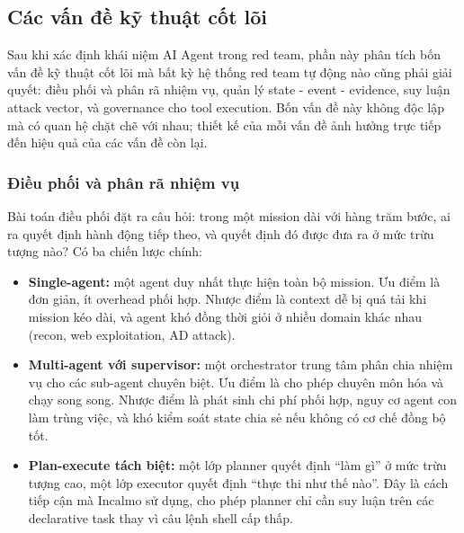 
\subsection{Các vấn đề kỹ thuật cốt lõi}
\label{sec:van-de-ky-thuat}

Sau khi xác định khái niệm AI Agent trong red team, phần này phân tích bốn vấn đề kỹ thuật cốt lõi mà bất kỳ hệ thống red team tự động nào cũng phải giải quyết: điều phối và phân rã nhiệm vụ, quản lý state - event - evidence, suy luận attack vector, và governance cho tool execution. Bốn vấn đề này không độc lập mà có quan hệ chặt chẽ với nhau; thiết kế của mỗi vấn đề ảnh hưởng trực tiếp đến hiệu quả của các vấn đề còn lại.

\subsubsection*{Điều phối và phân rã nhiệm vụ}

Bài toán điều phối đặt ra câu hỏi: trong một mission dài với hàng trăm bước, ai ra quyết định hành động tiếp theo, và quyết định đó được đưa ra ở mức trừu tượng nào? Có ba chiến lược chính:

\begin{itemize}
    \item \textbf{Single-agent:} một agent duy nhất thực hiện toàn bộ mission. Ưu điểm là đơn giản, ít overhead phối hợp. Nhược điểm là context dễ bị quá tải khi mission kéo dài, và agent khó đồng thời giỏi ở nhiều domain khác nhau (recon, web exploitation, AD attack).
    \item \textbf{Multi-agent với supervisor:} một orchestrator trung tâm phân chia nhiệm vụ cho các sub-agent chuyên biệt. Ưu điểm là cho phép chuyên môn hóa và chạy song song. Nhược điểm là phát sinh chi phí phối hợp, nguy cơ agent con làm trùng việc, và khó kiểm soát state chia sẻ nếu không có cơ chế đồng bộ tốt.
    \item \textbf{Plan-execute tách biệt:} một lớp planner quyết định ``làm gì'' ở mức trừu tượng cao, một lớp executor quyết định ``thực thi như thế nào''. Đây là cách tiếp cận mà Incalmo sử dụng, cho phép planner chỉ cần suy luận trên các declarative task thay vì câu lệnh shell cấp thấp.
\end{itemize}

